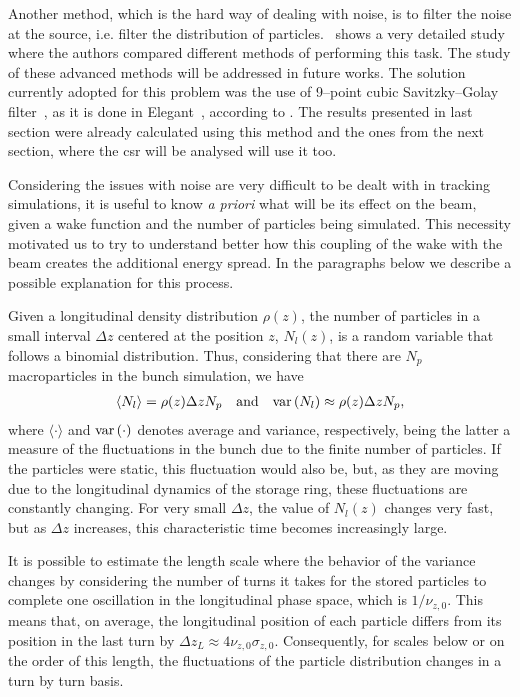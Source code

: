     Another method, which is the hard way of dealing with noise, is to filter the noise at the source, i.e. filter the distribution of particles.~ shows a very detailed study where the authors compared different methods of performing this task. The study of these advanced methods will be addressed in future works. The solution currently adopted for this problem was the use of 9--point cubic Savitzky--Golay filter~\cite{Savitzky1964}, as it is done in Elegant~\cite{Borland2000}, according to . The results presented in last section were already calculated using this method and the ones from the next section, where the \gls{csr} will be analysed will use it too.

    Considering the issues with noise are very difficult to be dealt with in tracking simulations, it is useful to know \emph{a priori} what will be its effect on the beam, given a wake function and the number of particles being simulated. This necessity motivated us to try to understand better how this coupling of the wake with the beam creates the additional energy spread. In the paragraphs below we describe a possible explanation for this process.

    Given a longitudinal density distribution $\rho(z)$, the number of particles in a small interval $\Delta z$ centered at the position $z$, $N_l(z)$, is a random variable that follows a binomial distribution. Thus, considering that there are $N_p$ macroparticles in the bunch simulation, we have
    \begin{align}
        \langle N_l \rangle = \rho(z)\Delta z N_p
        \quad \text{and}\quad
        \text{var}\left(N_l\right) \approx \rho(z)\Delta z N_p,
    \end{align}
    where $\langle\cdot\rangle$ and $\text{var}\left(\cdot\right)$ denotes average and variance, respectively, being the latter a measure of the fluctuations in the bunch due to the finite number of particles. If the particles were static, this fluctuation would also be, but, as they are moving due to the longitudinal dynamics of the storage ring, these fluctuations are constantly changing. For very small $\Delta z$, the value of $N_l(z)$ changes very fast, but as $\Delta z$ increases, this characteristic time becomes increasingly large.

    It is possible to estimate the length scale where the behavior of the variance changes by considering the number of turns it takes for the stored particles to complete one oscillation in the longitudinal phase space, which is $1/\nu_{z,0}$. This means that, on average, the longitudinal position of each particle differs from its position in the last turn by $\Delta z_L \approx 4\nu_{z,0}\sigma_{z,0}$. Consequently, for scales below or on the order of this length, the fluctuations of the particle distribution changes in a turn by turn basis.

